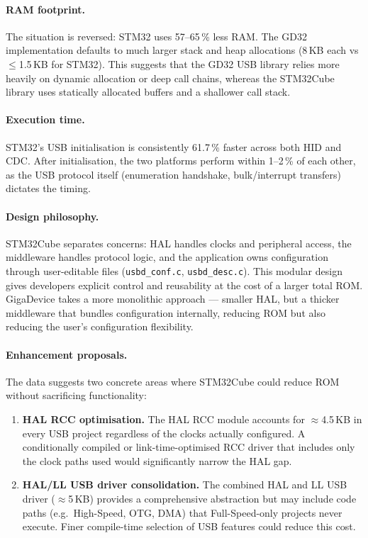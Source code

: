 \paragraph{RAM footprint.}
The situation is reversed: STM32 uses 57--65\,\% less RAM. The GD32 implementation
defaults to much larger stack and heap allocations (8\,KB each vs $\leq$1.5\,KB for STM32).
This suggests that the GD32 USB library relies more heavily on dynamic allocation or deep
call chains, whereas the STM32Cube library uses statically allocated buffers and a
shallower call stack.

\paragraph{Execution time.}
STM32's USB initialisation is consistently 61.7\,\% faster across both HID and CDC. After
initialisation, the two platforms perform within 1--2\,\% of each other, as the USB
protocol itself (enumeration handshake, bulk/interrupt transfers) dictates the timing.

\paragraph{Design philosophy.}
STM32Cube separates concerns: HAL handles clocks and peripheral access, the middleware
handles protocol logic, and the application owns configuration through user-editable files
(\texttt{usbd\_conf.c}, \texttt{usbd\_desc.c}). This modular design gives developers
explicit control and reusability at the cost of a larger total ROM. GigaDevice takes a more
monolithic approach --- smaller HAL, but a thicker middleware that bundles configuration
internally, reducing ROM but also reducing the user's configuration flexibility.

\paragraph{Enhancement proposals.}
The data suggests two concrete areas where STM32Cube could reduce ROM without sacrificing
functionality:

\begin{enumerate}
  \item \textbf{HAL RCC optimisation.} The HAL RCC module accounts for $\approx$4.5\,KB in
    every USB project regardless of the clocks actually configured. A conditionally compiled
    or link-time-optimised RCC driver that includes only the clock paths used would
    significantly narrow the HAL gap.
  \item \textbf{HAL/LL USB driver consolidation.} The combined HAL and LL USB driver
    ($\approx$5\,KB) provides a comprehensive abstraction but may include code paths
    (e.g.\ High-Speed, OTG, DMA) that Full-Speed-only projects never execute. Finer
    compile-time selection of USB features could reduce this cost.
\end{enumerate}

